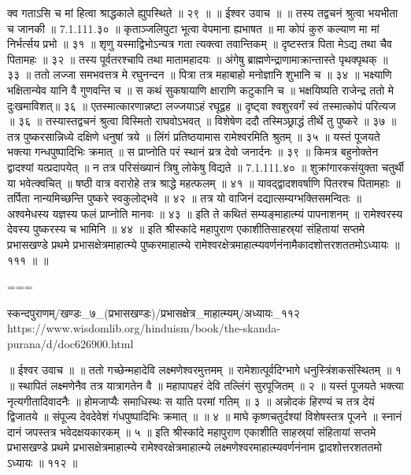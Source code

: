 क्व गताऽसि च मां हित्वा श्राद्धकाले ह्युपस्थिते ॥ २९ ॥
॥ ईश्वर उवाच ॥ ॥
तस्य तद्वचनं श्रुत्वा भयभीता च जानकी ॥ 7.1.111.३० ॥
कृताञ्जलिपुटा भूत्वा वेपमाना ह्यभाषत ॥
मा कोपं कुरु कल्याण मा मां निर्भर्त्सय प्रभो ॥ ३१ ॥
शृणु यस्माद्विभोऽन्यत्र गता त्यक्त्वा तवान्तिकम् ॥
दृष्टस्तत्र पिता मेऽद्य तथा चैव पितामहः ॥ ३२ ॥
तस्य पूर्वतरश्चापि तथा मातामहादयः ॥
अंगेषु ब्राह्मणेन्द्राणामाक्रान्तास्ते पृथक्पृथक् ॥ ३३ ॥
ततो लज्जा समभवत्तत्र मे रघुनन्दन ॥
पित्रा तत्र महाबाहो मनोज्ञानि शुभानि च ॥ ३४ ॥
भक्ष्याणि भक्षितान्येव यानि वै गुणवन्ति च ॥
स कथं सुकषायाणि क्षाराणि कटुकानि च ॥
भक्षयिष्यति राजेन्द्र ततो मे दुःखमाविशत्॥ ३६ ॥
एतस्मात्कारणान्नष्टा लज्जयाऽहं रघूद्वह ॥
दृष्ट्वा श्वशुरवर्गं स्वं तस्मात्कोपं परित्यज ॥ ३६ ॥
तस्यास्तद्वचनं श्रुत्वा विस्मितो राघवोऽभवत् ॥
विशेषेण ददौ तस्मिञ्छ्राद्धं तीर्थे तु पुष्करे ॥ ३७ ॥
तत्र पुष्करसान्निध्ये दक्षिणे धनुषां त्रये ॥
लिंगं प्रतिष्ठयामास रामेश्वरमिति श्रुतम् ॥ ३५ ॥
यस्तं पूजयते भक्त्या गन्धपुष्पादिभिः क्रमात् ॥
स प्राप्नोति परं स्थानं य्रत्र देवो जनार्दनः ॥ ३९ ॥
किमत्र बहुनोक्तेन द्वादश्यां यत्प्रदापयेत् ॥
न तत्र परिसंख्यानं त्रिषु लोकेषु विद्यते ॥ 7.1.111.४० ॥
शुक्रांगारकसंयुक्ता चतुर्थी या भवेत्क्वचित् ॥
षष्ठी वात्र वरारोहे तत्र श्राद्धे महत्फलम् ॥ ४१ ॥
यावद्द्वादशवर्षाणि पितरश्च पितामहाः ॥
तर्पिता नान्यमिच्छन्ति पुष्करे स्वकुलोद्भवे ॥ ४२ ॥
तत्र यो वाजिनं दद्यात्सम्यग्भक्तिसमन्वितः ॥
अश्वमेधस्य यज्ञस्य फलं प्राप्नोति मानवः ॥ ४३ ॥
इति ते कथितं सम्यङ्माहात्म्यं पापनाशनम् ॥
रामेश्वरस्य देवस्य पुष्करस्य च भामिनि ॥ ४४ ॥
इति श्रीस्कांदे महापुराण एकाशीतिसाहस्र्यां संहितायां सप्तमे प्रभासखण्डे प्रथमे प्रभासक्षेत्रमाहात्म्ये पुष्करमाहात्म्ये रामेश्वरक्षेत्रमाहात्म्यवर्णनंनामैकादशोत्तरशततमोऽध्यायः ॥ १११ ॥ ॥

===

स्कन्दपुराणम्/खण्डः_७_(प्रभासखण्डः)/प्रभासक्षेत्र_माहात्म्यम्/अध्यायः_११२
https://www.wisdomlib.org/hinduism/book/the-skanda-purana/d/doc626900.html


॥ ईश्वर उवाच ॥ ॥
ततो गच्छेन्महादेवि लक्ष्मणेश्वरमुत्तमम् ॥
रामेशात्पूर्वदिग्भागे धनुस्त्रिंशकसंस्थितम् ॥ १ ॥
स्थापितं लक्ष्मणेनैव तत्र यात्रागतेन वै ॥
महापापहरं देवि तल्लिंगं सुरपूजितम् ॥ २ ॥
यस्तं पूजयते भक्त्या नृत्यगीतादिवादनैः ॥
होमजाप्यैः समाधिस्थः स याति परमां गतिम् ॥ ३ ॥
अन्नोदकं हिरण्यं च तत्र देयं द्विजातये ॥
संपूज्य देवदेवेशं गंधपुष्पादिभिः क्रमात् ॥ ॥ ४ ॥
माघे कृष्णचतुर्दश्यां विशेषस्तत्र पूजने ॥
स्नानं दानं जपस्तत्र भवेदक्षयकारकम् ॥ ५ ॥
इति श्रीस्कांदे महापुराण एकाशीति साहस्र्यां संहितायां सप्तमे प्रभासखण्डे प्रथमे प्रभासक्षेत्रमाहात्म्ये रामेश्वरक्षेत्रमाहात्म्ये लक्ष्मणेश्वरमाहात्म्यवर्णनंनाम द्वादशोत्तरशततमो ऽध्यायः ॥ ११२ ॥


